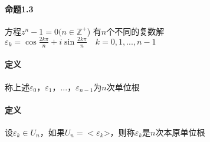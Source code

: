 \documentclass{ctexart}
\begin{document}
\paragraph{命题1.3}
方程$z^{n}-1=0 (n \in \mathbb{Z}^{+}$) 有$n$个不同的复数解\\ $\varepsilon_{k} = \cos\frac{2k\pi}{n} + i\sin\frac{2k\pi}{n}\quad k = 0,1,...,n - 1$
\paragraph{定义}
称上述$\varepsilon_{0}，\varepsilon_{1}，...，\varepsilon_{n-1}$为$n$次单位根
\paragraph{定义}
设$\varepsilon_{k} \in U_{n}$，如果$U_{n} = <\varepsilon_{k}$>，则称$\varepsilon_{k}$是$n$次本原单位根


\ifx\total\undefined
\end{document}
